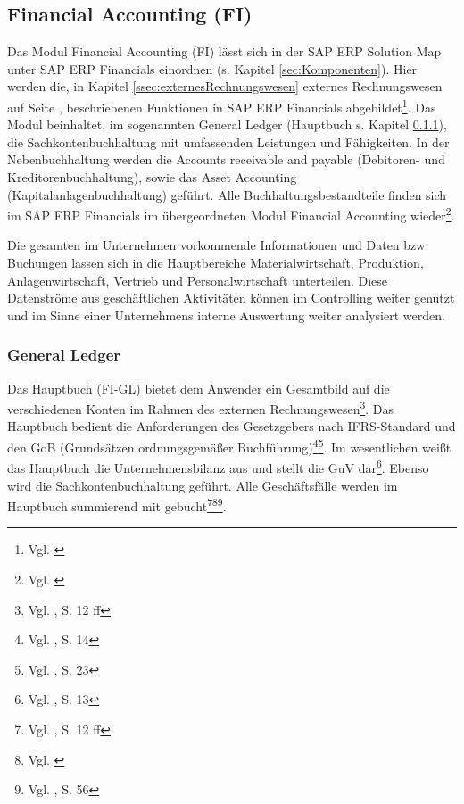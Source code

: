 \subsection{Financial Accounting (FI)} %
Das Modul Financial Accounting (FI) lässt sich in der SAP ERP Solution Map unter SAP ERP Financials einordnen (s. Kapitel \ref{sec:Komponenten}). 
Hier werden die, in Kapitel \ref{ssec:externesRechnungswesen} externes Rechnungswesen auf Seite \pageref{ssec:externesRechnungswesen}, beschriebenen Funktionen in SAP ERP Financials abgebildet\footnote{Vgl. \cite{SAPBusinessMaps2010}}. Das Modul beinhaltet, im sogenannten General Ledger (Hauptbuch s. Kapitel \ref{sec:gl}), die Sachkontenbuchhaltung mit umfassenden Leistungen und Fähigkeiten. In der Nebenbuchhaltung werden die Accounts receivable and payable (Debitoren- und Kreditorenbuchhaltung), sowie das Asset Accounting (Kapitalanlagenbuchhaltung) geführt. 
Alle Buchhaltungsbestandteile finden sich im SAP ERP Financials im übergeordneten Modul Financial Accounting wieder\footnote{Vgl. \cite{SAPBusinessMaps2010}}. 

Die gesamten im Unternehmen vorkommende Informationen und Daten bzw. Buchungen lassen sich in die Hauptbereiche Materialwirtschaft, Produktion, Anlagenwirtschaft, Vertrieb und Personalwirtschaft unterteilen. Diese Datenströme aus geschäftlichen Aktivitäten können im Controlling weiter genutzt und im Sinne einer Unternehmens interne Auswertung weiter analysiert werden.

\subsubsection{General Ledger} \label{sec:gl}%

Das Hauptbuch (FI-GL) bietet dem Anwender ein Gesamtbild auf die verschiedenen Konten im Rahmen des externen Rechnungswesen\footnote{Vgl. \cite{SAPGL2001}, S. 12 ff}. Das Hauptbuch bedient die Anforderungen des Gesetzgebers nach IFRS-Standard und den GoB (Grundsätzen ordnungsgemäßer Buchführung)\footnote{Vgl. \cite{SAPGL2001}, S. 14}\footnote{Vgl. \cite{SAPGL2001}, S. 23}. Im wesentlichen weißt das Hauptbuch die Unternehmensbilanz aus und stellt die GuV dar\footnote{Vgl. \cite{SAPGL2001}, S. 13}. Ebenso wird die Sachkontenbuchhaltung geführt. Alle Geschäftsfälle werden im Hauptbuch summierend mit gebucht\footnote{Vgl. \cite{SAPGL2001}, S. 12 ff}\footnote{Vgl. \cite{FICOForum2012}}\footnote{Vgl. \cite{SAPGL2001}, S. 56}. 

